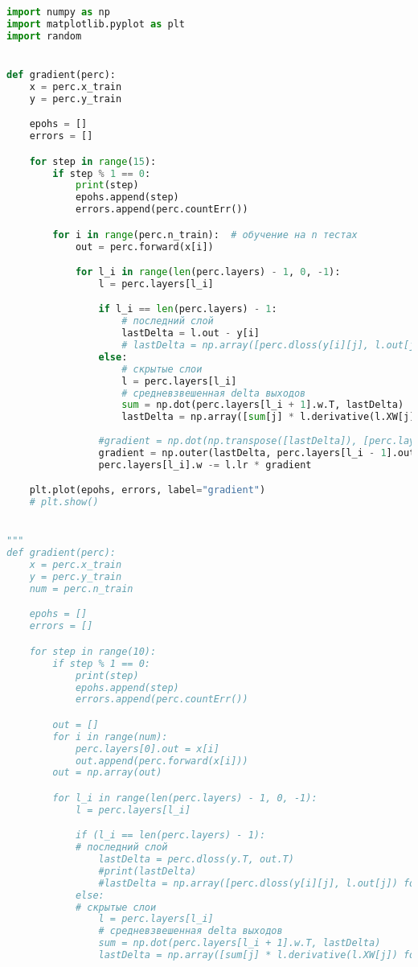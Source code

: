 \documentclass[a4paper, 14pt]{extarticle}
\begin{document}
\begin{lstlisting}[language=Python,caption={methods.py},label={lst:code2}]
import numpy as np
import matplotlib.pyplot as plt
import random


def gradient(perc):
    x = perc.x_train
    y = perc.y_train

    epohs = []
    errors = []

    for step in range(15):
        if step % 1 == 0:
            print(step)
            epohs.append(step)
            errors.append(perc.countErr())

        for i in range(perc.n_train):  # обучение на n тестах
            out = perc.forward(x[i])

            for l_i in range(len(perc.layers) - 1, 0, -1):
                l = perc.layers[l_i]

                if l_i == len(perc.layers) - 1:
                    # последний слой
                    lastDelta = l.out - y[i]
                    # lastDelta = np.array([perc.dloss(y[i][j], l.out[j]) for j in range(l.n_neurons)])
                else:
                    # скрытые слои
                    l = perc.layers[l_i]
                    # средневзвешенная delta выходов
                    sum = np.dot(perc.layers[l_i + 1].w.T, lastDelta)
                    lastDelta = np.array([sum[j] * l.derivative(l.XW[j]) for j in range(l.n_neurons)])
                    
                #gradient = np.dot(np.transpose([lastDelta]), [perc.layers[l_i - 1].out])
                gradient = np.outer(lastDelta, perc.layers[l_i - 1].out)
                perc.layers[l_i].w -= l.lr * gradient

    plt.plot(epohs, errors, label="gradient")
    # plt.show()


"""
def gradient(perc):
    x = perc.x_train
    y = perc.y_train
    num = perc.n_train

    epohs = []
    errors = []

    for step in range(10):
        if step % 1 == 0:
            print(step)
            epohs.append(step)
            errors.append(perc.countErr())

        out = []
        for i in range(num):
            perc.layers[0].out = x[i]
            out.append(perc.forward(x[i]))
        out = np.array(out)

        for l_i in range(len(perc.layers) - 1, 0, -1):
            l = perc.layers[l_i]

            if (l_i == len(perc.layers) - 1):
            # последний слой
                lastDelta = perc.dloss(y.T, out.T)
                #print(lastDelta)
                #lastDelta = np.array([perc.dloss(y[i][j], l.out[j]) for j in range(l.n_neurons)])
            else:
            # скрытые слои
                l = perc.layers[l_i]
                # средневзвешенная delta выходов
                sum = np.dot(perc.layers[l_i + 1].w.T, lastDelta)
                lastDelta = np.array([sum[j] * l.derivative(l.XW[j]) for j in range(l.n_neurons)])
                

\end{lstlisting}
\end{document}
